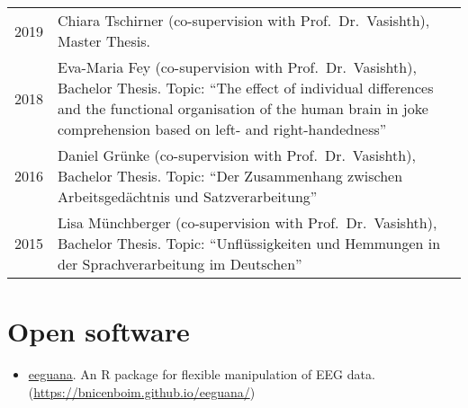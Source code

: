 \documentclass[]{article}
\providecommand{\tightlist}{%
  \setlength{\itemsep}{0pt}\setlength{\parskip}{0pt}}
\begin{document}
\begin{longtable}[]{@{}ll@{}}
\toprule
\endhead
\begin{minipage}[t]{0.25\columnwidth}\raggedright
2019\strut
\end{minipage} & \begin{minipage}[t]{0.69\columnwidth}\raggedright
Chiara Tschirner (co-supervision with Prof.~Dr.~Vasishth), Master
Thesis.\strut
\end{minipage}\tabularnewline
\begin{minipage}[t]{0.25\columnwidth}\raggedright
2018\strut
\end{minipage} & \begin{minipage}[t]{0.69\columnwidth}\raggedright
Eva-Maria Fey (co-supervision with Prof.~Dr.~Vasishth), Bachelor Thesis.
Topic: ``The effect of individual differences and the functional
organisation of the human brain in joke comprehension based on left- and
right-handedness''\strut
\end{minipage}\tabularnewline
\begin{minipage}[t]{0.25\columnwidth}\raggedright
2016\strut
\end{minipage} & \begin{minipage}[t]{0.69\columnwidth}\raggedright
Daniel Grünke (co-supervision with Prof.~Dr.~Vasishth), Bachelor Thesis.
Topic: ``Der Zusammenhang zwischen Arbeitsgedächtnis und
Satzverarbeitung''\strut
\end{minipage}\tabularnewline
\begin{minipage}[t]{0.25\columnwidth}\raggedright
2015\strut
\end{minipage} & \begin{minipage}[t]{0.69\columnwidth}\raggedright
Lisa Münchberger (co-supervision with Prof.~Dr.~Vasishth), Bachelor
Thesis. Topic: ``Unflüssigkeiten und Hemmungen in der Sprachverarbeitung
im Deutschen''\strut
\end{minipage}\tabularnewline
\bottomrule
\end{longtable}

\hypertarget{open-software}{%
\section{Open software}\label{open-software}}

\begin{itemize}
\tightlist
\item
  \href{https://bnicenboim.github.io/eeguana/}{eeguana}. An R package
  for flexible manipulation of EEG data.
  (\url{https://bnicenboim.github.io/eeguana/})
\end{itemize}
\end{document}
